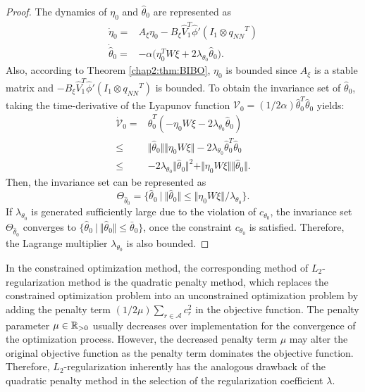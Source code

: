 \begin{proof}
The dynamics of $\eta_0$ and $\hat\theta_0$ are represented as
\begin{equation}
    \begin{aligned}     
        \dot\eta_0 =& 
        A_\xi\eta_0 -B_\xi 
        \hat V_1^T\hat\phi'(I_1\otimes {q_{NN}}^T)
        \\
        \dot{\hat\theta}_0
        =&
        -\alpha 
        \bigg(
            \eta_0^TW\xi+2\lambda_{\theta_0} \hat\theta_0
        \bigg)
        .
    \end{aligned}
\end{equation}
Also, according to Theorem \ref{chap2:thm:BIBO}, $\eta_0$ is bounded since $A_\xi$ is a stable matrix and $-B_\xi\hat V_1^T\hat\phi'(I_1\otimes {q_{NN}}^T)$ is bounded.
To obtain the invariance set of $\hat\theta_0$, taking the time-derivative of the Lyapunov function $\mathcal V_0=(1/2\alpha)\hat\theta_0^T\hat\theta_0$ yields:
\begin{equation}
    \begin{aligned}
        \dot {\mathcal V}_0 =& 
        \hat\theta_0^T (-\eta_0W\xi -2\lambda_{\theta_0}\hat\theta_0)
        \\
        \le &
        \Vert\hat\theta_0\Vert \Vert \eta_0W\xi\Vert -2\lambda_{\theta_0} \hat\theta_0^T\hat\theta_0
        \\
        \le &
        -2\lambda_{\theta_0} \Vert\hat\theta_0\Vert^2 + \Vert \eta_0W\xi\Vert \Vert \hat\theta_0\Vert 
        .
    \end{aligned}
\end{equation}
Then, the invariance set can be represented as 
\begin{equation}
    \Theta_{\hat\theta_0} =
    \{
        \hat\theta_0\ \vert \ \Vert\hat\theta_0\Vert \le \Vert\eta_0W\xi\Vert/\lambda_{\theta_0}
    \}
    .    
\end{equation}
If $\lambda_{\theta_0}$ is generated sufficiently large due to the violation of $c_{\theta_0}$, the invariance set $\Theta_{\hat\theta_0}$ converges to $\{\hat\theta_0\ \vert \ \Vert\hat\theta_0\Vert \le \bar\theta_0\}$, once the constraint $c_{\theta_0}$ is satisfied. 
Therefore, the Lagrange multiplier $\lambda_{\theta_0}$ is also bounded.

\end{proof}

\begin{remark}
    In the constrained optimization method, the corresponding method of $L_2$-regularization method is the quadratic penalty method, which replaces the constrained optimization problem into an unconstrained optimization problem by adding the penalty term $(1/2\mu)\sum_{r\in\mathcal A} c_r^2$ in the objective function.
    The penalty parameter $\mu\in\mathbb{R}_{>0}$ usually decreases over implementation for the convergence of the optimization process.
    However, the decreased penalty term $\mu$ may alter the original objective function as the penalty term dominates the objective function.
    Therefore, $L_2$-regularization inherently has the analogous drawback of the quadratic penalty method in the selection of the regularization coefficient $\lambda$.
\end{remark}

